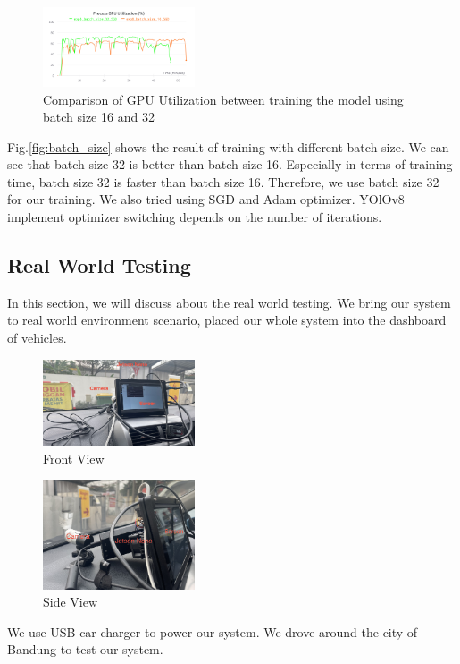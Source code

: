 \documentclass[conference]{IEEEtran}
\begin{document}
\begin{figure}[h!]
\centering
\includegraphics[width=0.4\textwidth,keepaspectratio]{gpu_utilization_comparison.png} 
\caption{Comparison of GPU Utilization between training the model using batch size 16 and 32}
\label{fig:gpu_utilization}
\end{figure}
Fig.\ref{fig:batch_size} shows the result of training with different batch size. We can see that batch size 32 is better than batch size 16. Especially in terms of training time, batch size 32 is faster than batch size 16.
Therefore, we use batch size 32 for our training. We also tried using SGD and Adam optimizer. YOlOv8 implement optimizer switching depends on the number of iterations.



\subsection{Real World Testing}
In this section, we will discuss about the real world testing. We bring our system to real world environment scenario, placed our whole system into the dashboard of vehicles.
\begin{figure}[h!]
    \centering
    \includegraphics[width=0.4\textwidth,keepaspectratio]{mounted_camera_front_view.jpg}
    \caption{Front View}
    \label{fig:front_view}
\end{figure}

\begin{figure}[h!]
    \centering
    \includegraphics[width=0.4\textwidth,keepaspectratio]{mounted_camera_side_view.jpg}
    \caption{Side View}
    \label{fig:side_view}
\end{figure}
We use USB car charger to power our system. We drove around the city of Bandung to test our system. 
\end{document}
